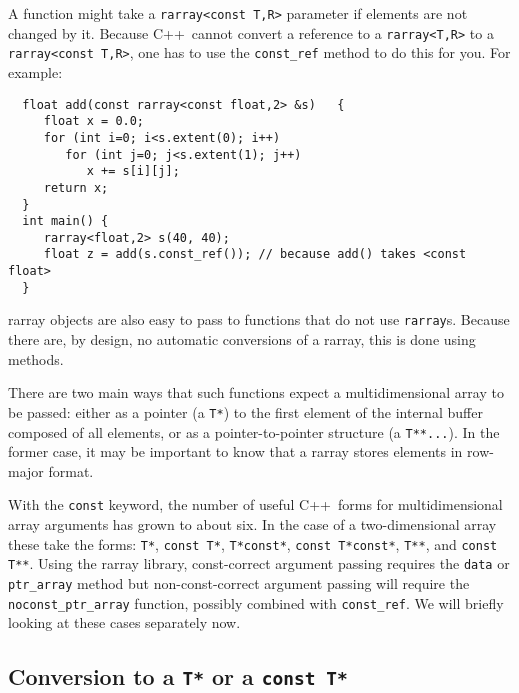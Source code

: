 \documentclass[11pt,twoside]{article}
\newcommand{\cxx}{C{++}}
\begin{document}
A function might take a \texttt{rarray{\tt<}const T,R{\tt>}} parameter if elements are not changed by it. Because \cxx\ cannot convert a reference to a \texttt{rarray{\tt<}T,R{\tt>}} to a \texttt{rarray{\tt<}const T,R{\tt>}}, one has to use the \texttt{const\_ref} method to do this for you.
For example:
\vspace{-5pt}\begin{framed}\vspace{-14pt}%
\begin{verbatim}
  float add(const rarray<const float,2> &s)   {
     float x = 0.0;
     for (int i=0; i<s.extent(0); i++)
        for (int j=0; j<s.extent(1); j++)
           x += s[i][j];
     return x;
  }
  int main() {
     rarray<float,2> s(40, 40);
     float z = add(s.const_ref()); // because add() takes <const float>
  }
\end{verbatim}%
\vspace{-14pt}
\end{framed}\vspace{-8pt}

rarray objects are also easy to pass to functions that do not use \texttt{rarray}s. Because there are, by design, no automatic conversions of a
rarray, this is done using methods.

There are two main ways that such functions expect a multidimensional
array to be passed: either as a pointer (a \texttt{T*}) to the first
element of the internal buffer composed of all elements, or as a
pointer-to-pointer structure (a \texttt{T**...}).  In the former case, it may be
important to know that a rarray stores elements in row-major
format.

With the \texttt{const} keyword, the number of useful \cxx\ forms for multidimensional array arguments has grown to about six.  In the case of a two-dimensional array these take the forms:
 \texttt{T*}, \texttt{const T*}, \texttt{T*const*}, \texttt{const T*const*}, \texttt{T**}, and \texttt{const T**}.
Using the rarray library, const-correct argument passing requires the \texttt{data} or \texttt{ptr\_array} method but non-const-correct argument passing will require the \texttt{noconst\_ptr\_array} function, possibly combined with \texttt{const\_ref}.
We will briefly looking at these cases separately now.

\subsection{Conversion to a {\tt T*} or a {\tt const T*}}
\end{document}
